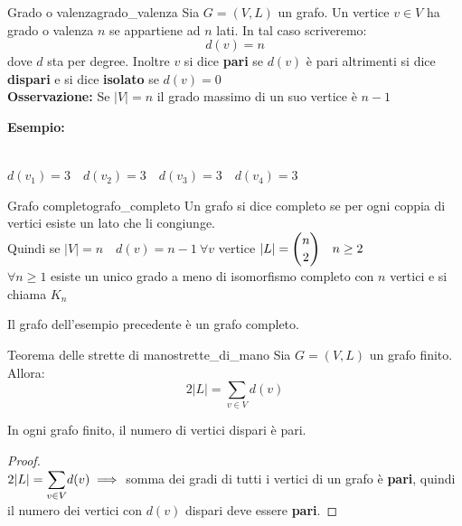 \documentclass[12pt, letterpaper]{report}
\newcounter{theorem}
\newcounter{corollary}
\newcounter{definition}
\newcommand{\nmu}{}
\begin{document}
   	\begin{definition}{\nmu Grado o valenza}{grado_valenza}
   		Sia $G=(V, L)$ un grafo. Un vertice $v \in V$ ha grado o valenza $n$ se appartiene ad $n$ lati. In tal caso scriveremo:
   		\[
   		d(v) = n
   		\]
   		dove $d$ sta per degree. Inoltre $v$ si dice \textbf{pari} se $d(v)$ è pari altrimenti si dice \textbf{dispari} e si dice \textbf{isolato} se $d(v)=0$ \\
   		\textbf{Osservazione:} Se $|V|=n$ il grado massimo di un suo vertice è $n-1$
   	\end{definition}
   	\textbf{Esempio:}
   	 \\
   	$d(v_1) = 3 \quad d(v_2) = 3 \quad d(v_3) = 3 \quad d(v_4) = 3$
   	\begin{definition}{\nmu Grafo completo}{grafo_completo}
   		Un grafo si dice completo se per ogni coppia di vertici esiste un lato che li congiunge. \\
   		Quindi se $|V|=n \quad d(v) = n - 1\ \forall v$ vertice $|L| = \mathlarger{\binom{n}{2}} \quad n \geq 2$ \\
   		$\forall n \geq 1$ esiste un unico grado a meno di isomorfismo completo con $n$ vertici e si chiama $K_n$
   	\end{definition}
   	Il grafo dell'esempio precedente è un grafo completo.
   	\begin{theorem}{\nmu Teorema delle strette di mano}{strette_di_mano}
   		Sia $G=(V, L)$ un grafo finito. Allora:
   		\[
   		2|L| = \sum_{v \in V}d(v)
   		\]
   	\end{theorem}
   	\begin{corollary}
   		In ogni grafo finito, il numero di vertici dispari è pari.
   		\begin{proof} \quad \\
   			$2|L| = \mathlarger{\sum_{v \in V}}d(v) \implies$ somma dei gradi di tutti i vertici di un grafo è \textbf{pari}, quindi il numero dei vertici con $d(v)$ dispari deve essere \textbf{pari}.
   		\end{proof}
   	\end{corollary}
\end{document}
